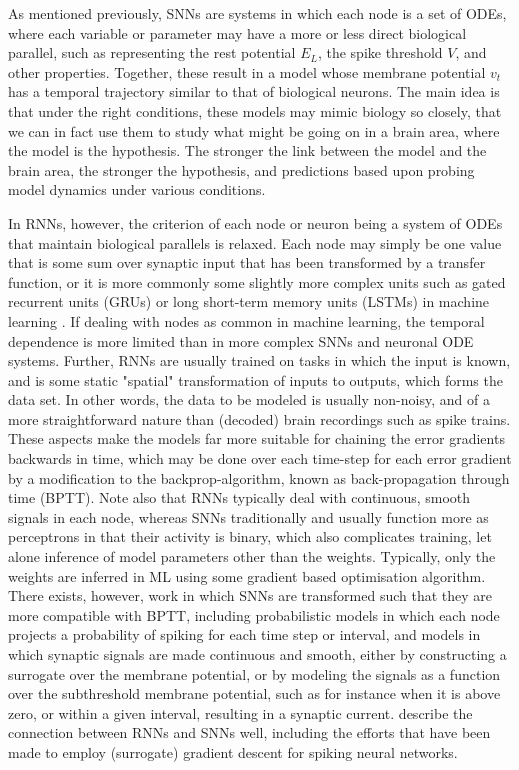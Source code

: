 \documentclass[mphil,deptreport,ai]{infthesis} %
\begin{document}
As mentioned previously, SNNs are systems in which each node is a set of ODEs, where each variable or parameter may have a more or less direct biological parallel, such as representing the rest potential $E_L$, the spike threshold $V$, and other properties.
Together, these result in a model whose membrane potential $v_t$ has a temporal trajectory similar to that of biological neurons.
The main idea is that under the right conditions, these models may mimic biology so closely, that we can in fact use them to study what might be going on in a brain area, where the model is the hypothesis.
The stronger the link between the model and the brain area, the stronger the hypothesis, and predictions based upon probing model dynamics under various conditions.

In RNNs, however, the criterion of each node or neuron being a system of ODEs that maintain biological parallels is relaxed. Each node may simply be one value that is some sum over synaptic input that has been transformed by a transfer function, or it is more commonly some slightly more complex units such as gated recurrent units (GRUs) \cite{Bengio2013b, Chung2015a} or long short-term memory units (LSTMs) in machine learning \cite{Hochreiter1997, Schmidhuber2014}.
If dealing with nodes as common in machine learning, the temporal dependence is more limited than in more complex SNNs and neuronal ODE systems.
Further, RNNs are usually trained on tasks in which the input is known, and is some static "spatial" transformation of inputs to outputs, which forms the data set.
In other words, the data to be modeled is usually non-noisy, and of a more straightforward nature than (decoded) brain recordings such as spike trains.
These aspects make the models far more suitable for chaining the error gradients backwards in time, which may be done over each time-step for each error gradient by a modification to the backprop-algorithm, known as back-propagation through time (BPTT).
Note also that RNNs typically deal with continuous, smooth signals in each node, whereas SNNs traditionally and usually function more as perceptrons in that their activity is binary, which also complicates training, let alone inference of model parameters other than the weights.
Typically, only the weights are inferred in ML using some gradient based optimisation algorithm.
There exists, however, work in which SNNs are transformed such that they are more compatible with BPTT, including probabilistic models in which each node projects a probability of spiking for each time step or interval, and models in which synaptic signals are made continuous and smooth, either by constructing a surrogate over the membrane potential, or by modeling the signals as a function over the subthreshold membrane potential, such as for instance when it is above zero, or within a given interval, resulting in a synaptic current.
\cite{Neftci2019} describe the connection between RNNs and SNNs well, including the efforts that have been made to employ (surrogate) gradient descent for spiking neural networks.
\end{document}
